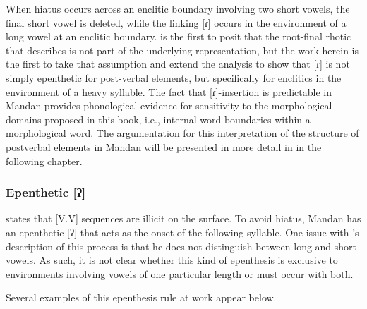 When hiatus occurs across an enclitic boundary involving two short vowels, the final short vowel is deleted, while the linking [ɾ] occurs in the environment of a long vowel at an enclitic boundary. \citet{carter1991a} is the first to posit that the root-final rhotic that \citet{hollow1970} describes is not part of the underlying representation, but the work herein is the first to take that assumption and extend the analysis to show that [ɾ] is not simply epenthetic for post-verbal elements, but specifically for enclitics in the environment of a heavy syllable. The fact that [ɾ]-insertion is predictable in Mandan provides phonological evidence for sensitivity to the morphological domains proposed in this book, i.e., internal word boundaries within a morphological word. The argumentation for this interpretation of the structure of postverbal elements in Mandan will be presented in more detail in  in the following chapter.

\subsubsection{Epenthetic [ʔ]}\label{intrusiveglottal}

\citet[47]{hollow1970} states that [V.V] sequences are illicit on the surface. To avoid hiatus, Mandan has an epenthetic [ʔ] that acts as the onset of the following syllable. One issue with \citeauthor{hollow1970}'s description of this process is that he does not distinguish between long and short vowels. As such, it is not clear whether this kind of epenthesis is exclusive to environments involving vowels of one particular length or must occur with both.

Several examples of this epenthesis rule at work appear below.

